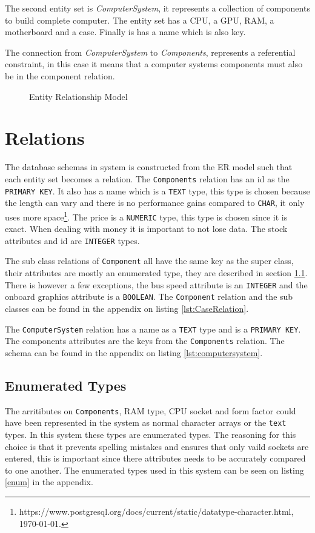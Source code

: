 \documentclass[12pt,a4paper]{article}
\begin{document}
The second entity set is \emph{ComputerSystem}, it represents a collection of components to build complete computer. The entity set has a CPU, a GPU, RAM, a motherboard and a case. Finally is has a name which is also key. 

The connection from \emph{ComputerSystem} to \emph{Components}, represents a referential constraint, in this case it means that a computer systems components must also be in the component relation.

\begin{figure}[!htbp]
    \centering
    
    \caption{Entity Relationship Model}
    \label{fig:er}
\end{figure}

\section{Relations}
The database schemas in system is constructed from the ER model such that each entity set becomes a relation.
The \texttt{Components} relation has an id as the \texttt{PRIMARY KEY}. 
It also has a name which is a \texttt{TEXT} type, this type is chosen because the length can vary and there is no performance gains compared to \texttt{CHAR}, it only uses more space\footnote{https://www.postgresql.org/docs/current/static/datatype-character.html, \today.}.
The price is a \texttt{NUMERIC} type, this type is chosen since it is exact. When dealing with money it is important to not lose data.
The stock attributes and id are \texttt{INTEGER} types.

The sub class relations of \texttt{Component} all have the same key as the super class, their attributes are mostly an enumerated type, they are described in section \ref{sec:enum}. 
There is however a few exceptions, the bus speed attribute is an \texttt{INTEGER} and the onboard graphics attribute is a \texttt{BOOLEAN}. The \texttt{Component} relation and the sub classes can be found in the appendix on listing \ref{lst:CaseRelation}.

The \texttt{ComputerSystem} relation has a name as a \texttt{TEXT} type and is a \texttt{PRIMARY KEY}. The components attributes are the keys from the \texttt{Components} relation. The schema can be found in the appendix on listing \ref{lst:computersystem}. 

\subsection{Enumerated Types}
\label{sec:enum}
The arritibutes on \texttt{Components}, RAM type, CPU socket and form factor could have been represented in the system as normal character arrays or the \texttt{text} types. 
In this system these types are enumerated types.
The reasoning for this choice is that it prevents spelling mistakes and ensures that only vaild sockets are entered, this is important since there attributes needs to be accurately compared to one another.
The enumerated types used in this system can be seen on listing \ref{enum} in the appendix.
\end{document}
